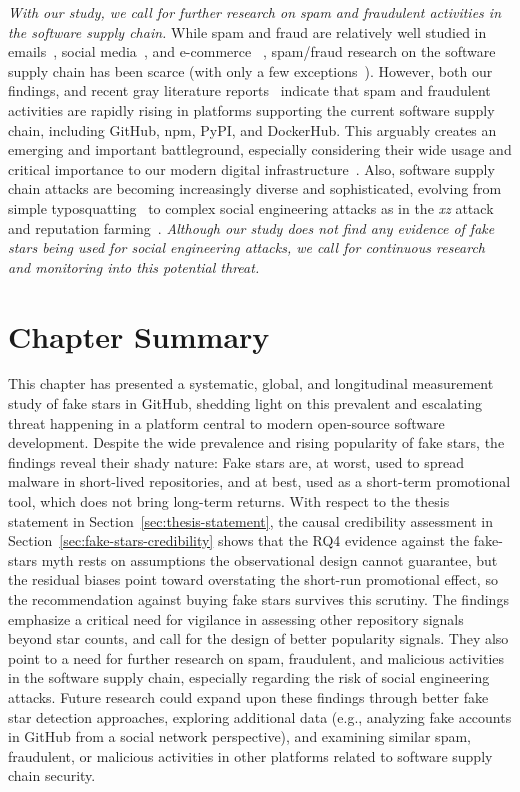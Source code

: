 \emph{With our study, we call for further research on spam and fraudulent activities in the software supply chain.}
While spam and fraud are relatively well studied in emails~\cite{DBLP:journals/air/BlanzieriB08}, social media~\cite{DBLP:journals/snam/AljabriZSASA23}, and e-commerce ~\cite{DBLP:journals/hcisys/HeWCX22}, spam/fraud research on the software supply chain has been scarce (with only a few exceptions~\cite{wu2025exposing, DBLP:conf/acsac/DuYZDWH0020}). 
However, both our findings, and recent gray literature reports~\cite{npm-spam, pypi-spam, docker-hub-spam} indicate that spam and fraudulent activities are rapidly rising in platforms supporting the current software supply chain, including GitHub, npm, PyPI, and DockerHub.
This arguably creates an emerging and important battleground, especially considering their wide usage and critical importance to our modern digital infrastructure~\cite{eghbal2016roads}.
Also, software supply chain attacks are becoming increasingly diverse and sophisticated, evolving from simple typosquatting~\cite{DBLP:conf/dimva/OhmPS020} to complex social engineering attacks as in the \textit{xz} attack~\cite{xz-attack} and reputation farming~\cite{reputation-farm}.
\emph{Although our study does not find any evidence of fake stars being used for social engineering attacks, we call for continuous research and monitoring into this potential threat.}

\section{Chapter Summary}

This chapter has presented a systematic, global, and longitudinal measurement study of fake stars in GitHub, shedding light on this prevalent and escalating threat happening in a platform central to modern open-source software development.
Despite the wide prevalence and rising popularity of fake stars, the findings reveal their shady nature:
Fake stars are, at worst, used to spread malware in short-lived repositories, and at best, used as a short-term promotional tool, which does not bring long-term returns.
With respect to the thesis statement in Section~\ref{sec:thesis-statement}, the causal credibility assessment in Section~\ref{sec:fake-stars-credibility} shows that the RQ4 evidence against the fake-stars myth rests on assumptions the observational design cannot guarantee, but the residual biases point toward overstating the short-run promotional effect, so the recommendation against buying fake stars survives this scrutiny.
The findings emphasize a critical need for vigilance in assessing other repository signals beyond star counts, and call for the design of better popularity signals.
They also point to a need for further research on spam, fraudulent, and malicious activities in the software supply chain, especially regarding the risk of social engineering attacks.
Future research could expand upon these findings through better fake star detection approaches, exploring additional data (e.g., analyzing fake accounts in GitHub from a social network perspective), and examining similar spam, fraudulent, or malicious activities in other platforms related to software supply chain security.

